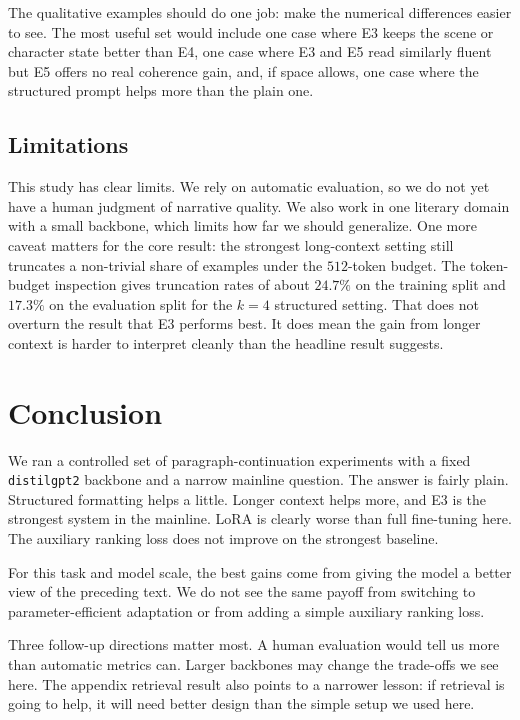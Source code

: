 \documentclass{article}
\newcommand{\model}{\texttt{distilgpt2}}
\newcommand{\expid}[1]{\textsc{#1}}
\begin{document}
The qualitative examples should do one job: make the numerical differences easier to see. The most useful set would include one case where \expid{E3} keeps the scene or character state better than \expid{E4}, one case where \expid{E3} and \expid{E5} read similarly fluent but \expid{E5} offers no real coherence gain, and, if space allows, one case where the structured prompt helps more than the plain one.

\subsection{Limitations}

This study has clear limits. We rely on automatic evaluation, so we do not yet have a human judgment of narrative quality. We also work in one literary domain with a small backbone, which limits how far we should generalize. One more caveat matters for the core result: the strongest long-context setting still truncates a non-trivial share of examples under the $512$-token budget. The token-budget inspection gives truncation rates of about $24.7\%$ on the training split and $17.3\%$ on the evaluation split for the $k=4$ structured setting. That does not overturn the result that \expid{E3} performs best. It does mean the gain from longer context is harder to interpret cleanly than the headline result suggests.

\section{Conclusion}

We ran a controlled set of paragraph-continuation experiments with a fixed \model{} backbone and a narrow mainline question. The answer is fairly plain. Structured formatting helps a little. Longer context helps more, and \expid{E3} is the strongest system in the mainline. LoRA is clearly worse than full fine-tuning here. The auxiliary ranking loss does not improve on the strongest baseline.

For this task and model scale, the best gains come from giving the model a better view of the preceding text. We do not see the same payoff from switching to parameter-efficient adaptation or from adding a simple auxiliary ranking loss.

Three follow-up directions matter most. A human evaluation would tell us more than automatic metrics can. Larger backbones may change the trade-offs we see here. The appendix retrieval result also points to a narrower lesson: if retrieval is going to help, it will need better design than the simple setup we used here.
\end{document}
